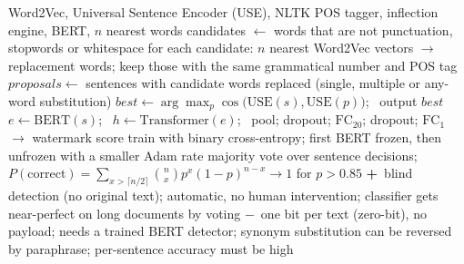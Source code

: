 \documentclass[10pt,a4paper,twocolumn]{article}
\newcommand{\pro}[1]{\Statex\textcolor{proc}{\textbf{+}\ #1}}
\newcommand{\con}[1]{\Statex\textcolor{conc}{\textbf{$-$}\ #1}}
\begin{document}
\begin{algorithm}[H]\small
\caption{DeepTextMark (Munyer \& Zhong 2023)}
\begin{algorithmic}[1]
\Require Word2Vec, Universal Sentence Encoder (USE), NLTK POS tagger, inflection engine, BERT, $n$ nearest words
  \State candidates $\gets$ words that are not punctuation, stopwords or whitespace
  \State for each candidate: $n$ nearest Word2Vec vectors $\to$ replacement words; keep those with the same grammatical number and POS tag
  \State $\mathit{proposals}\gets$ sentences with candidate words replaced (single, multiple or any-word substitution)
  \State $\mathit{best}\gets\arg\max_{p}\cos\big(\mathrm{USE}(s),\mathrm{USE}(p)\big)$; \ output $\mathit{best}$ 
 \EndFor
\EndProcedure
{}
 \State $e\gets\mathrm{BERT}(s)$; \ $h\gets\mathrm{Transformer}(e)$; \ pool; dropout; $\mathrm{FC}_{20}$; dropout; $\mathrm{FC}_1$ $\to$ watermark score
 \State train with binary cross-entropy; first BERT frozen, then unfrozen with a smaller Adam rate
\EndProcedure
{}
 \State majority vote over sentence decisions; $P(\mathrm{correct})=\sum_{x>\lceil n/2\rceil}\binom nxp^x(1-p)^{n-x}\to1$ for $p>0.85$
\EndProcedure
\pro{blind detection (no original text); automatic, no human intervention; classifier gets near-perfect on long documents by voting}
\con{one bit per text (zero-bit), no payload; needs a trained BERT detector; synonym substitution can be reversed by paraphrase; per-sentence accuracy must be high}
\end{algorithmic}
\end{algorithm}
\end{document}
